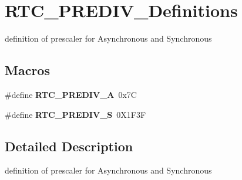 \hypertarget{group___r_t_c___p_r_e_d_i_v___definitions}{}\section{R\+T\+C\+\_\+\+P\+R\+E\+D\+I\+V\+\_\+\+Definitions}
\label{group___r_t_c___p_r_e_d_i_v___definitions}


definition of prescaler for Asynchronous and Synchronous  


\subsection*{Macros}
\begin{DoxyCompactItemize}
\item 
\mbox{\label{group___r_t_c___p_r_e_d_i_v___definitions_ga7d28a18fc36cff684ad43ffd31ca45fc}} 
\#define {\bfseries R\+T\+C\+\_\+\+P\+R\+E\+D\+I\+V\+\_\+A}~0x7C
\item 
\mbox{\label{group___r_t_c___p_r_e_d_i_v___definitions_ga3578b56bdfe76014a3af7e276fe6a6e4}} 
\#define {\bfseries R\+T\+C\+\_\+\+P\+R\+E\+D\+I\+V\+\_\+S}~0\+X1\+F3F
\end{DoxyCompactItemize}


\subsection{Detailed Description}
definition of prescaler for Asynchronous and Synchronous 

